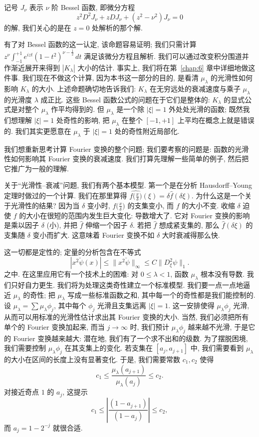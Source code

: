 \begin{remark}\label{rem:2.4}
记号 $J_{\nu}$ 表示 $\nu$ 阶 Bessel 函数, 即微分方程
\[
z^{2}D^{2}J_{\nu}+zD J_{\nu}+(z^{2}-\nu^{2})J_{\nu}=0
\]
的解, 我们关心的是在 $z=0$ 处解析的那个解.

有了对 Bessel 函数的这一认定, 该命题容易证明; 我们只需计算
$z^{\nu}\int_{-1}^{+1}e^{izt}(1-t^2)^{\nu-\frac{1}{2}}\,dt$
满足该微分方程且解析. 我们可以通过改变积分围道并作渐近展开来得到 $|K_\lambda|$ 大小的估计. 事实上, 我们将在第~\ref{chap:6} 章中详细地做这件事. 我们现在不做这个计算, 因为本书这一部分的目的, 是看清 $\mu_\lambda$ 的光滑性如何影响 $K_\lambda$ 的大小. 上述命题确切地告诉我们: $K_\lambda$ 在无穷远处的衰减速度与乘子 $\mu_\lambda$ 的光滑度 $\lambda$ 成正比. 这些 Bessel 函数公式的问题在于它们是整体的: $K_\lambda$ 的显式公式是对整个 $\mu_\lambda$ 作平均得到的. 但 $\mu_\lambda$ 是一个除 $|\xi|=1$ 外处处光滑的函数; 既然我们想理解 $|\xi|=1$ 处奇性的影响, 把 $\mu_\lambda$ 在整个 $[-1,+1]$ 上平均在概念上就是错误的. 我们其实更愿意在 $\mu_\lambda$ 于 $|\xi|=1$ 处的奇性附近局部化.
\end{remark}


我们想重新思考计算 Fourier 变换的整个问题; 我们要考察的问题是: 函数的光滑性如何影响其 Fourier 变换的衰减速度. 我们打算先理解一些简单的例子, 然后把它推广为一般的理解.

关于``光滑性--衰减''问题, 我们有两个基本模型. 第一个是在分析 Hausdorff--Young 定理时做过的一个计算. 我们在那里算得 $\widehat{f\bigl(\frac{x}{\delta}\bigr)}(\xi)=\delta\hat{f}(\delta\xi)$. 为什么这是一个关于光滑性的结果? 因为当 $\delta$ 变小时, $f\bigl(\frac{x}{\delta}\bigr)$ 的支集变小, 而 $f$ 的大小不变. 收缩 $\delta$ 迫使 $f$ 的大小在很短的范围内发生巨大变化: 导数增大了. 它对 Fourier 变换的影响是乘以因子 $\delta$ (小), 并把 $\hat{f}$ 伸缩一个因子 $\delta$. 若把 $\hat{f}$ 想成紧支集的, 那么 $\hat{f}(\delta\xi)$ 的支集随 $\delta$ 变小而扩大. 这意味着 Fourier 变换不如 $\delta$ 大时衰减得那么快.

这一切都是定性的; 定量的分析包含在不等式
\[
|x^{2}\check{\psi}(x)|\leq\|x^{2}\check{\psi}\|_{\infty}\leq C\|D_{\xi}^{2}\psi\|_{1}.
\]
之中. 在这里应用它有一个技术上的困难: 对 $0\leq\lambda<1$, 函数 $\mu_\lambda$ 根本没有导数. 我们只好自力更生. 我们将为处理这类奇性建立一个标准模型. 我们要一点一点地逼近 $\mu_\lambda$ 的奇性; 把 $\mu_\lambda$ 写成一些标准函数之和, 其中每一个的奇性都是我们能控制的. 设 $\mu_\lambda=\sum\mu_\lambda\phi_j$, 其中每个 $\phi_j$ 光滑且支集远离 $|\xi|=1$. 这一安排使得 $\mu_\lambda\phi_j$ 光滑, 从而可以用标准的光滑性估计求出其 Fourier 变换的大小. 当然, 我们必须把所有单个的 Fourier 变换加起来, 而当 $j\to\infty$ 时, 我们预计 $\mu_\lambda\phi_j$ 越来越不光滑, 于是它的 Fourier 变换越来越大: 潜在地, 我们有了一个求不出和的级数. 为了摆脱困境, 我们需要控制 $\mu_\lambda\phi_j$ 在其支集上的变化. 若支集在 $[a_j,a_{j+1}]$ 中, 我们需要看到 $\mu_\lambda$ 的大小在区间的长度上没有显著变化. 于是, 我们需要常数 $c_1,c_2$ 使得
\[
c_{1}\leq\frac{\mu_{\lambda}(a_{j+1})}{\mu_{\lambda}(a_{j})}\leq c_{2}.
\]
对接近奇点 $1$ 的 $a_j$, 这提示
\[
c_{1}\leq\left|\frac{(1-a_{j+1})}{(1-a_{j})}\right|\leq c_{2},
\]
而 $a_{j}=1-2^{-j}$ 就很合适.

